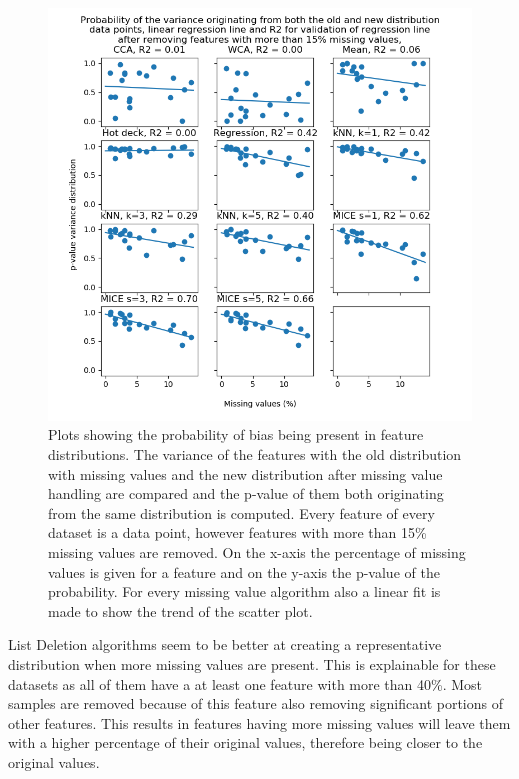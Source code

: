 \documentclass[10pt,a4paper]{report}
\begin{document}
	\begin{figure}[]
		\centering
		\includegraphics[width=\textwidth]{Var_Dist_Extra_ACA.PNG}
		\caption{Plots showing the probability of bias being present in feature distributions. The variance of the features with the old distribution with missing values and the new distribution after missing value handling are compared and the p-value of them both originating from the same distribution is computed. Every feature of every dataset is a data point, however features with more than 15\% missing values are removed. On the x-axis the percentage of missing values is given for a feature and on the y-axis the p-value of the probability. For every missing value algorithm also a linear fit is made to show the trend of the scatter plot.}
		\label{fig:PVarianceFitsACA}
	\end{figure}
	
	List Deletion algorithms seem to be better at creating a representative distribution when more missing values are present. This is explainable for these datasets as all of them have a at least one feature with more than 40\%. Most samples are removed because of this feature also removing significant portions of other features. This results in features having more missing values will leave them with a higher percentage of their original values, therefore being closer to the original values.
	
\end{document}
